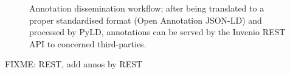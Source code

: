 \begin{figure}[!ht]
  \centering
  \caption[Annotation dissemination workflow]
          {Annotation dissemination workflow; after being translated to a proper
           standardised format (Open Annotation JSON-LD) and processed by PyLD,
           annotations can be served by the Invenio REST API to concerned
           third-parties.}
  \label{fig:restanno}
\end{figure}

FIXME: REST, add annos by REST
